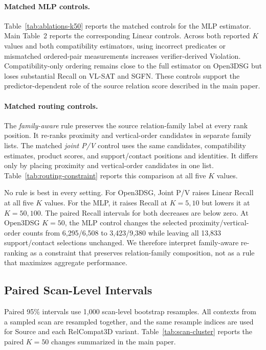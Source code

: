 \paragraph{Matched MLP controls.}
Table~\ref{tab:ablations-k50} reports the matched controls for the MLP estimator. Main Table~2 reports the corresponding Linear controls. Across both reported $K$ values and both compatibility estimators, using incorrect predicates or mismatched ordered-pair measurements increases verifier-derived Violation. Compatibility-only ordering remains close to the full estimator on Open3DSG but loses substantial Recall on VL-SAT and SGFN. These controls support the predictor-dependent role of the source relation score described in the main paper.

\paragraph{Matched routing controls.}
The \emph{family-aware} rule preserves the source relation-family label at every rank position. It re-ranks proximity and vertical-order candidates in separate family lists. The matched \emph{joint P/V} control uses the same candidates, compatibility estimates, product scores, and support/contact positions and identities. It differs only by placing proximity and vertical-order candidates in one list. Table~\ref{tab:routing-constraint} reports this comparison at all five $K$ values.

No rule is best in every setting. For Open3DSG, Joint P/V raises Linear Recall at all five $K$ values. For the MLP, it raises Recall at $K=5,10$ but lowers it at $K=50,100$. The paired Recall intervals for both decreases are below zero. At Open3DSG $K=50$, the MLP control changes the selected proximity/vertical-order counts from 6,295/6,508 to 3,423/9,380 while leaving all 13,833 support/contact selections unchanged. We therefore interpret family-aware re-ranking as a constraint that preserves relation-family composition, not as a rule that maximizes aggregate performance.

\subsection{Paired Scan-Level Intervals}
Paired 95\% intervals use 1,000 scan-level bootstrap resamples. All contexts from a sampled scan are resampled together, and the same resample indices are used for Source and each RelCompat3D variant. Table~\ref{tab:scan-cluster} reports the paired $K=50$ changes summarized in the main paper.

